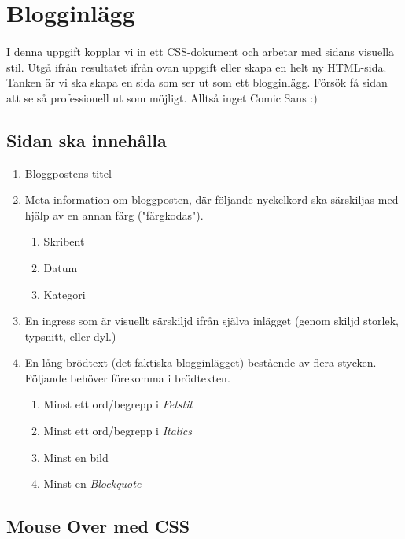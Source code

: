 \documentclass{article}
\begin{document}
  \newpage
  \section{ Blogginlägg }
    \paragraph{}
    I denna uppgift kopplar vi in ett CSS-dokument och arbetar med sidans visuella stil. Utgå ifrån resultatet ifrån ovan uppgift eller skapa en helt ny HTML-sida. Tanken är vi ska skapa en sida som ser ut som ett blogginlägg. Försök få sidan att se så professionell ut som möjligt. Alltså inget Comic Sans :)

    \subsection*{Sidan ska innehålla}
      \begin{enumerate}
        \item Bloggpostens titel
        \item Meta-information om bloggposten, där följande nyckelkord ska särskiljas med hjälp av en annan färg ("färgkodas").
          \begin{enumerate}
            \item Skribent
            \item Datum
            \item Kategori
          \end{enumerate}
        \item En ingress som är visuellt särskiljd ifrån själva inlägget (genom skiljd storlek, typsnitt, eller dyl.)
        \item En lång brödtext (det faktiska blogginlägget) bestående av flera stycken. Följande behöver förekomma i brödtexten.
          \begin{enumerate}
            \item Minst ett ord/begrepp i \emph{Fetstil}
            \item Minst ett ord/begrepp i \emph{Italics}
            \item Minst en bild
            \item Minst en \emph{Blockquote}
          \end{enumerate}
      \end{enumerate}

\subsection{ Mouse Over med CSS }
\end{document}
